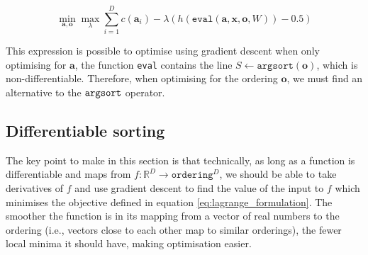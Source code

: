 \begin{equation} \label{eq:lagrange_formulation}
	\min_{\mathbf{a, o}} \max_\lambda \sum_{i=1}^D c(\mathbf{a}_i) - \lambda (h(\texttt{eval}(\mathbf{a, x, o}, W))-0.5)
\end{equation}

This expression is possible to optimise using gradient descent when only optimising for $\mathbf{a}$, the function \texttt{eval} contains the line $S \leftarrow \texttt{argsort}(\mathbf{o})$, which is non-differentiable. Therefore, when optimising for the ordering $\mathbf{o}$, we must find an alternative to the $\operatorname*{\texttt{argsort}}$ operator.

\subsection{Differentiable sorting}

The key point to make in this section is that technically, as long as a function is differentiable and maps from $f: \mathbb{R}^D \rightarrow \texttt{ordering}^D$, we should be able to take derivatives of $f$ and use gradient descent to find the value of the input to $f$ which minimises the objective defined in equation \ref{eq:lagrange_formulation}. The smoother the function is in its mapping from a vector of real numbers to the ordering (i.e., vectors close to each other map to similar orderings), the fewer local minima it should have, making optimisation easier.